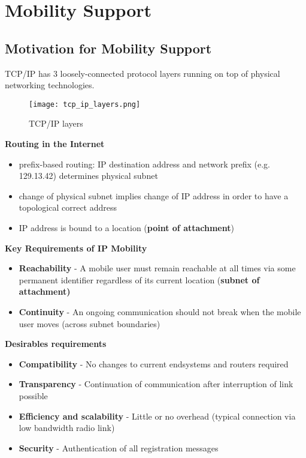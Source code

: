\chapter{Mobility Support}
\label{mobility support}

\section{Motivation for Mobility Support}

TCP/IP has 3 loosely-connected protocol layers running on top of physical
networking technologies.

\begin{figure}[H]
  \centering
  \texttt{[image: tcp\_ip\_layers.png]}
  \caption{TCP/IP layers}
  \label{fig:tcpiplayers}
\end{figure}

\textbf{Routing in the Internet}

\begin{itemize}
\item prefix-based routing: IP destination address and network prefix (e.g.
129.13.42) determines physical subnet
\item change of physical subnet implies change of IP address in order to have a
topological correct address
\item IP address is bound to a location (\textbf{point of attachment})
\end{itemize}

\textbf{Key Requirements of IP Mobility}

\begin{itemize}
\item \textbf{Reachability} - A mobile user must remain reachable at all times
via some permanent identifier regardless of its current location (\textbf{subnet
of attachment)}
\item \textbf{Continuity} - An ongoing communication should not break when the
mobile user moves (across subnet boundaries)
\end{itemize}

\textbf{Desirables requirements}

\begin{itemize}
\item \textbf{Compatibility} - No changes to current endsystems and routers
required
\item \textbf{Transparency} - Continuation of communication after interruption
of link possible
\item \textbf{Efficiency and scalability} - Little or no overhead (typical
connection via low bandwidth radio link)
\item \textbf{Security} - Authentication of all registration messages
\end{itemize}

